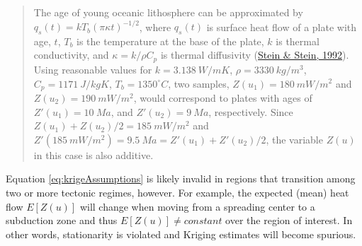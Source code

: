 \begin{quote}
The age of young oceanic lithosphere can be approximated by \(q_s(t) = kT_b(\pi\kappa t)^{-1/2}\), where \(q_s(t)\) is surface heat flow of a plate with age, \(t\), \(T_b\) is the temperature at the base of the plate, \(k\) is thermal conductivity, and \(\kappa = k/\rho C_p\) is thermal diffusivity (\protect\hyperlink{ref-stein1992}{Stein \& Stein, 1992}). Using reasonable values for \(k = 3.138~W/mK\), \(\rho = 3330~kg/m^3\), \(C_p = 1171~J/kgK\), \(T_b = 1350^{\circ}C\), two samples, \(Z(u_1) = 180~mW/m^2\) and \(Z(u_2) = 190~mW/m^2\), would correspond to plates with ages of \(Z'(u_1) = 10~Ma\), and \(Z'(u_2) = 9~Ma\), respectively. Since \(Z(u_1) + Z(u_2) / 2 = 185~mW/m^2\) and \(Z'(185~mW/m^2) = 9.5~Ma = Z'(u_1) + Z'(u_2) / 2\), the variable \(Z(u)\) in this case is also additive.
\end{quote}

Equation \eqref{eq:krigeAssumptions} is likely invalid in regions that transition among two or more tectonic regimes, however. For example, the expected (mean) heat flow \(E[Z(u)]\) will change when moving from a spreading center to a subduction zone and thus \(E[Z(u)] \neq constant\) over the region of interest. In other words, stationarity is violated and Kriging estimates will become spurious.

